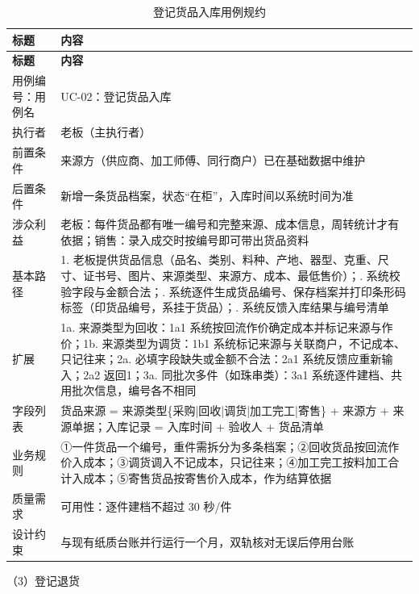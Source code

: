 \documentclass[12pt, a4paper]{ctexart}
\begin{document}
{\small
\begin{longtable}{@{}p{2.4cm} p{12.9cm}@{}}
\caption{登记货品入库用例规约}\label{tab:uc-02}\\
\toprule
\textbf{标题} & \textbf{内容} \\
\midrule
\endfirsthead
\toprule
\textbf{标题} & \textbf{内容} \\
\midrule
\endhead
用例编号：用例名 & UC-02：登记货品入库 \\
\midrule
执行者 & 老板（主执行者） \\
\midrule
前置条件 & 来源方（供应商、加工师傅、同行商户）已在基础数据中维护 \\
\midrule
后置条件 & 新增一条货品档案，状态“在柜”，入库时间以系统时间为准 \\
\midrule
涉众利益 & 老板：每件货品都有唯一编号和完整来源、成本信息，周转统计才有依据；\newline 销售：录入成交时按编号即可带出货品资料 \\
\midrule
基本路径 & 1. 老板提供货品信息（品名、类别、料种、产地、器型、克重、尺寸、证书号、图片、来源类型、来源方、成本、最低售价）；\newline 2. 系统校验字段与金额合法；\newline 3. 系统逐件生成货品编号、保存档案并打印条形码标签（印货品编号，系挂于货品）；\newline 4. 系统反馈入库结果与编号清单 \\
\midrule
扩展 & 1a. 来源类型为回收：1a1 系统按回流作价确定成本并标记来源与作价；\newline 1b. 来源类型为调货：1b1 系统标记来源与关联商户，不记成本、只记往来；\newline 2a. 必填字段缺失或金额不合法：2a1 系统反馈应重新输入；2a2 返回1；\newline 3a. 同批次多件（如珠串类）：3a1 系统逐件建档、共用批次信息，编号各不相同 \\
\midrule
字段列表 & 货品来源 = 来源类型\{采购|回收|调货|加工完工|寄售\} + 来源方 + 来源单据；\newline 入库记录 = 入库时间 + 验收人 + 货品清单 \\
\midrule
业务规则 & ①一件货品一个编号，重件需拆分为多条档案；\newline ②回收货品按回流作价入成本；\newline ③调货调入不记成本，只记往来；\newline ④加工完工按料加工合计入成本；\newline ⑤寄售货品按寄售价入成本，作为结算依据 \\
\midrule
质量需求 & 可用性：逐件建档不超过 30 秒/件 \\
\midrule
设计约束 & 与现有纸质台账并行运行一个月，双轨核对无误后停用台账 \\
\midrule
\bottomrule
\end{longtable}}
\noindent（3）登记退货
\end{document}
